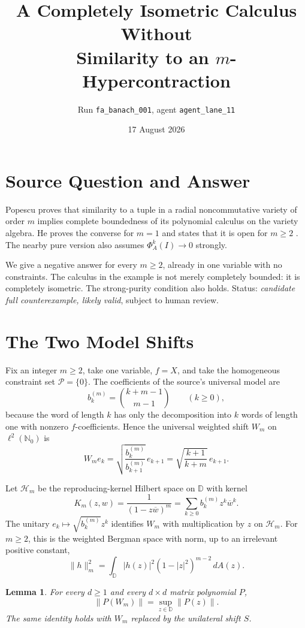 \documentclass[11pt]{article}
\title{A Completely Isometric Calculus Without\\
Similarity to an $m$-Hypercontraction}
\author{Run \texttt{fa\_banach\_001}, agent \texttt{agent\_lane\_11}}
\date{17 August 2026}
\newtheorem{lemma}{Lemma}
\newcommand{\D}{\mathbb D}
\newcommand{\Hc}{\mathcal H}
\begin{document}
\maketitle

\section*{Source Question and Answer}

Popescu proves that similarity to a tuple in a radial noncommutative
variety of order $m$ implies complete boundedness of its polynomial
calculus on the variety algebra.  He proves the converse for $m=1$ and
states that it is open for $m\geq2$ \cite[Introduction and Section~3]{P}.
The nearby pure version also assumes
$\Phi_A^k(I)\to0$ strongly.

We give a negative answer for every $m\geq2$, already in one variable with
no constraints.  The calculus in the example is not merely completely
bounded: it is completely isometric.  The strong-purity condition also
holds.  Status: \emph{candidate full counterexample, likely valid}, subject
to human review.

\section*{The Two Model Shifts}

Fix an integer $m\geq2$, take one variable, $f=X$, and take the homogeneous
constraint set $\mathcal P=\{0\}$.  The coefficients of the source's
universal model are
\[
 b_k^{(m)}=\binom{k+m-1}{m-1}\qquad(k\geq0),
 \tag{1}\label{eq:b}
\]
because the word of length $k$ has only the decomposition into $k$ words
of length one with nonzero $f$-coefficients.  Hence the universal weighted
shift $W_m$ on $\ell^2(\mathbb N_0)$ is
\[
 W_m e_k=\sqrt{\frac{b_k^{(m)}}{b_{k+1}^{(m)}}}\,e_{k+1}
          =\sqrt{\frac{k+1}{k+m}}\,e_{k+1}.
 \tag{2}\label{eq:weight}
\]

Let $\Hc_m$ be the reproducing-kernel Hilbert space on $\D$ with kernel
\[
 K_m(z,w)=\frac{1}{(1-z\overline w)^m}
          =\sum_{k\geq0}b_k^{(m)}z^k\overline w^k.
 \tag{3}\label{eq:kernel}
\]
The unitary $e_k\mapsto\sqrt{b_k^{(m)}}z^k$ identifies $W_m$ with
multiplication by $z$ on $\Hc_m$.  For $m\geq2$, this is the weighted
Bergman space with norm, up to an irrelevant positive constant,
\[
 \|h\|_m^2=\int_{\D}|h(z)|^2(1-|z|^2)^{m-2}\,dA(z).
 \tag{4}\label{eq:bergman}
\]

\begin{lemma}\label{lem:norm}
For every $d\geq1$ and every $d\times d$ matrix polynomial $P$,
\[
 \|P(W_m)\|=\sup_{z\in\D}\|P(z)\|.
 \tag{5}\label{eq:norm}
\]
The same identity holds with $W_m$ replaced by the unilateral shift $S$.
\end{lemma}
\end{document}
